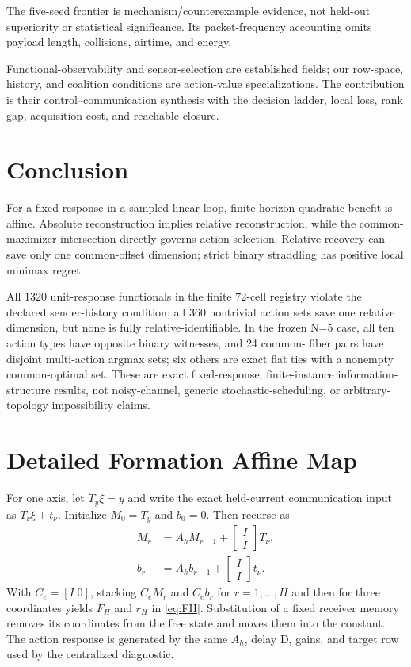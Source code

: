 \documentclass[10pt,twocolumn,twoside]{IEEEtran}
\begin{document}
The five-seed frontier is mechanism/counterexample evidence, not held-out
superiority or statistical significance.  Its packet-frequency accounting
omits payload length, collisions, airtime, and energy.

Functional-observability and sensor-selection are established fields; our
row-space, history, and coalition conditions are action-value specializations.
The contribution is their control--communication synthesis with the decision
ladder, local loss, rank gap, acquisition cost, and reachable closure.

\section{Conclusion}

For a fixed response in a sampled linear loop, finite-horizon quadratic benefit
is affine.  Absolute reconstruction implies relative reconstruction, while the
common-maximizer intersection directly governs action selection.  Relative
recovery can save only one common-offset dimension; strict binary straddling
has positive local minimax regret.

All 1320 unit-response functionals in the finite 72-cell registry violate the
declared sender-history condition; all 360 nontrivial action sets save one
relative dimension, but none is fully relative-identifiable.  In the frozen
N=5 case, all ten action types have opposite binary witnesses, and 24 common-
fiber pairs have disjoint multi-action argmax sets; six others are exact flat
ties with a nonempty common-optimal set.  These are exact fixed-response,
finite-instance information-structure results, not noisy-channel, generic
stochastic-scheduling, or arbitrary-topology impossibility claims.

\appendices
\section{Detailed Formation Affine Map}

For one axis, let \(T_y\xi=y\) and write the exact held-current communication
input as \(T_\nu\xi+t_\nu\).  Initialize \mbox{\(M_0=T_y\)} and
\mbox{\(b_0=0\)}.  Then recurse as
\begin{align}
M_r&=A_hM_{r-1}+\begin{bmatrix}I\\I\end{bmatrix}T_\nu,\\
b_r&=A_hb_{r-1}+\begin{bmatrix}I\\I\end{bmatrix}t_\nu.
\end{align}
With \(C_e=[I\;0]\), stacking \(C_eM_r\) and \(C_eb_r\) for
\(r=1,\ldots,H\) and then for three coordinates yields \(F_H\) and \(r_H\)
in \eqref{eq:FH}.  Substitution of a fixed receiver memory removes its
coordinates from the free state and moves them into the constant.  The action
response is generated by the same \(A_h\), delay D, gains, and target row used
by the centralized diagnostic.
\end{document}
